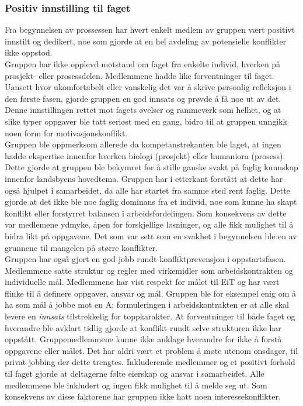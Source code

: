 \subsubsection{Positiv innstilling til faget}

Fra begynnelsen av prossessen har hvert enkelt medlem av gruppen vært positivt innstilt og dedikert, noe som gjorde at en hel avdeling av potensielle konflikter ikke oppstod.
\\
Gruppen har ikke opplevd motstand om faget fra enkelte individ, hverken på prosjekt- eller prosessdelen. 
Medlemmene hadde like forventninger til faget. Uansett hvor ukomfortabelt eller vanskelig det var å skrive personlig refleksjon i den første fasen, gjorde gruppen en god innsats og prøvde å få noe ut av det.
Denne innstillingen rettet mot fagets øvelser og rammeverk som helhet, og at slike typer oppgaver ble tatt seriøst med en gang, bidro til at gruppen unngikk noen form for motivasjonskonflikt.
\\
Gruppen ble oppmerksom allerede da kompetanstrekanten ble laget, at ingen hadde ekspertise innenfor hverken biologi (prosjekt) eller humaniora (prosess).
Dette gjorde at gruppen ble bekymret for å stille ganske svakt på faglig kunnskap innenfor landsbyens hovedtema.
Gruppen har i etterkant forstått at dette har også hjulpet i samarbeidet, da alle har startet fra samme sted rent faglig.
Dette gjorde at det ikke ble noe faglig dominans fra et individ, noe som kunne ha skapt konflikt eller forstyrret balansen i arbeidsfordelingen.
Som konsekvens av dette var medlemene ydmyke, åpen for forskjellige løsninger, og alle fikk mulighet til å bidra likt på oppgavene.
Det som var sett som en svakhet i begynnelsen ble en av grunnene til mangelen på større konflikter.
\\
Gruppen har også gjort en god jobb rundt konfliktprevensjon i oppstartsfasen. 
Medlemmene satte struktur og regler med virkemidler som arbeidskontrakten og individuelle mål. 
Medlemmene har vist respekt for målet til EiT og har vært flinke til å definere oppgaver, ansvar og mål.
Gruppen ble for eksempel enig om å ha som mål å jobbe mot en A; formuleringen i arbeidskontrakten er at alle skal levere en \emph{innsats} tilstrekkelig for toppkarakter.
At forventninger til både faget og hverandre ble avklart tidlig gjorde at konflikt rundt selve strukturen ikke har oppstått. Gruppemedlemmene kunne ikke anklage hverandre for ikke å forstå oppgavene eller målet.
Det har aldri vært et problem å møte utenom onsdager, til privat jobbing der dette trengtes.
Inkluderende medlemmer og et positivt forhold til faget gjorde at deltagerne følte eierskap og ansvar i samarbeidet.
Alle medlemmene ble inkludert og ingen fikk mulighet til å melde seg ut.
Som konsekvens av disse faktorene har gruppen ikke hatt noen interessekonflikter.
\\